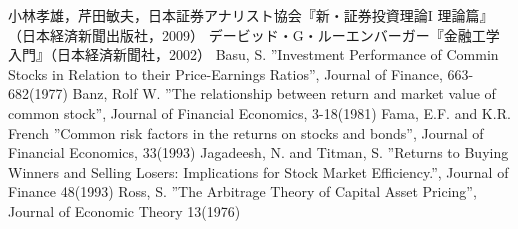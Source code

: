 \documentclass[11pt]{jreport}
\begin{document}
\begin{thebibliography}{30}
	 小林孝雄，芹田敏夫，日本証券アナリスト協会『新・証券投資理論I 理論篇』（日本経済新聞出版社，2009）
	 デービッド・G・ルーエンバーガー『金融工学入門』（日本経済新聞社，2002）
	 Basu, S. ''Investment Performance of Commin Stocks in Relation to their Price-Earnings Ratios'', Journal of Finance, 663-682(1977)
	 Banz, Rolf W. ''The relationship between return and market value of common stock'', Journal of Financial Economics, 3-18(1981)
	 Fama, E.F. and K.R. French ''Common risk factors in the returns on stocks and bonds'', Journal of Financial Economics, 33(1993)
	 Jagadeesh, N. and Titman, S. ''Returns to Buying Winners and Selling Losers: Implications for Stock Market Efficiency.'', Journal of Finance 48(1993)
	 Ross, S. ''The Arbitrage Theory of Capital Asset Pricing'', Journal of Economic Theory 13(1976)
	
\end{thebibliography}
\end{document}
